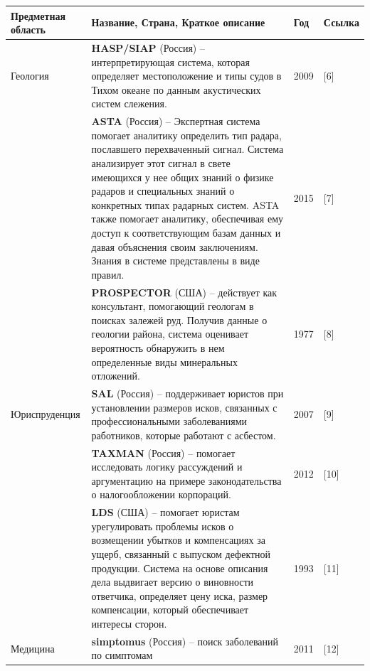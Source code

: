 \documentclass[14pt,a4paper,report]{report}
\begin{document}
\begin{table}[h!]
\centering
\bgroup
\def\arraystretch{1}
\begin{tabular}{ | P{2cm} | P{13cm} | P{1cm} | P{0.5cm} | }
\hline
Предметная область & Название, Страна, Краткое описание & Год & Ссылка 
\\ \hline

Геология 

& \textbf{HASP/SIAP} (Россия) -- интерпретирующая система, которая определяет местоположение и типы судов в Тихом океане по данным акустических систем слежения. & 2009 & [6] \\ \hline

& \textbf{ASTA} (Россия) -- Экспертная система помогает аналитику определить тип радара, пославшего перехваченный сигнал. Система анализирует этот сигнал в свете имеющихся у нее общих знаний о физике радаров и специальных знаний о конкретных типах радарных систем. ASTA также помогает аналитику, обеспечивая ему доступ к соответствующим базам данных и давая объяснения своим заключениям. Знания в системе представлены в виде правил. & 2015 & [7] \\ \hline

& \textbf{PROSPECTOR} (США) -- действует как консультант, помогающий геологам в поисках залежей руд. Получив данные о геологии района, система оценивает вероятность обнаружить в нем определенные виды минеральных отложений. & 1977 & [8] \\ \hline


Юриспруденция 

& \textbf{SAL} (Россия) -- поддерживает юристов при установлении размеров исков, связанных с профессиональными заболеваниями работников, которые работают с асбестом. & 2007 & [9] \\ \hline

& \textbf{TAXMAN} (Россия) -- помогает исследовать логику рассуждений и аргументацию на примере законодательства о налогообложении корпораций. & 2012 & [10] \\ \hline

& \textbf{LDS} (США) -- помогает юристам урегулировать проблемы исков о возмещении убытков и компенсациях за ущерб, связанный с выпуском дефектной продукции. Система на основе описания дела выдвигает версию о виновности ответчика, определяет цену иска, размер компенсации, который обеспечивает интересы сторон. & 1993 & [11] \\ \hline


Медицина 

& \textbf{simptomus} (Россия) -- поиск заболеваний по симптомам & 2011 & [12] \\ \hline


\end{tabular}
\end{table}
\end{document}
